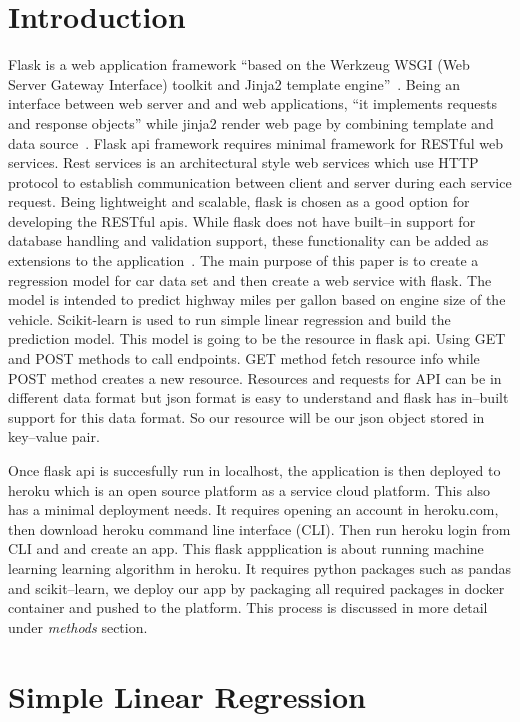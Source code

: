 \section{Introduction}
Flask is a web application framework ``based on the Werkzeug WSGI (Web Server
Gateway Interface) toolkit and Jinja2 template 
engine''~\cite{hid-sp18-415-flask}. Being an interface between web server
and and web applications, ``it implements requests and response objects'' 
while jinja2 render web page by combining template and data 
source~\cite{hid-sp18-415-www-flask}. 
Flask api framework requires minimal framework for RESTful web services.
Rest services is an architectural style web services which use HTTP protocol
to establish communication between client and server during each service
request.
Being lightweight and scalable, flask is chosen as a good option for 
developing the RESTful apis. While flask does not have built--in support for 
database handling and validation support, these functionality can be added as
extensions to the application~\cite{hid-sp18-415-www-flask}.
The main purpose of this paper is
to create a regression model for car data set and then create a web service
with flask. The model is intended to
predict highway miles per gallon based on engine size of the vehicle.
Scikit-learn is used to run simple linear regression and build the prediction
model. This model is going
to be the resource in flask api. Using GET and POST methods to call
endpoints. GET method fetch resource info while POST method creates
a new resource. Resources and requests for API can be in different data
format but json format
is easy to understand and flask has in--built support for this data format. So 
our resource will be our json object stored in key--value pair.
  
Once flask api is succesfully run in localhost, the application is
then deployed to heroku which is an open source platform as a 
service cloud platform. This also has a minimal deployment needs.
It requires opening an account in heroku.com, then download heroku
command line interface (CLI). Then run heroku login from CLI and
and create an app. This flask appplication is about running machine learning
learning algorithm in heroku. It requires python packages such as pandas and 
scikit--learn, we deploy our app by packaging all required packages in docker
container and pushed to the platform. This process is discussed in more detail 
under \textit{methods} section.
  
\section{Simple Linear Regression}

